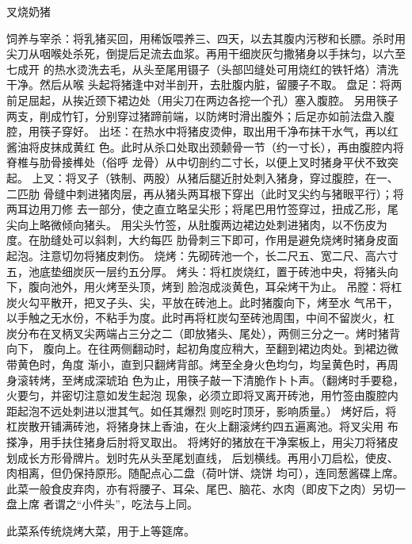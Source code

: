 \begin{recipe}{叉烧奶猪}

\ingredients


\preparation

\step 饲养与宰杀：将乳猪买回，用稀饭喂养三、四天，以去其腹内污秽和长膘。杀时用
尖刀从咽喉处杀死，倒提后足流去血浆。再用干细炭灰匀撒猪身以手抹匀，以六至七成开
的热水烫洗去毛，从头至尾用镊子（头部凹缝处可用烧红的铁钎烙）清洗干净。然后从喉
头起将猪逢中对半剖开，去肚腹内脏，留腰子不取。
\step 盘足：将两前足屈起，从挨近颈下裙边处（用尖刀在两边各挖一个孔）塞入腹腔。
另用筷子两支，削成竹钉，分别穿过猪蹄前端，以防烤时滑出腹外；后足亦如前法盘入腹
腔，用筷子穿好。
\step 出坯：在热水中将猪皮烫伸，取出用千净布抹干水气，再以红酱油将皮抹成黄红
色。此时从杀口处取出颈颡骨一节（约一寸长），再由腹腔内将脊椎与肋骨接榫处（俗呼
龙骨）从中切剖约二寸长，以便上叉时猪身平伏不致突起。
\step 上叉：将叉子（铁制、两股）从猪后腿近肘处刺入猪身，穿过腹腔，在一、二匹肋
骨缝中刺进猪肉层，再从猪头两耳根下穿出（此时叉尖约与猪眼平行）；将两耳边用刀修
去一部分，使之直立略呈尖形；将尾巴用竹签穿过，扭成乙形，尾尖向上略微倾向猪头。
用尖头竹签，从肚腹两边裙边处刺进猪肉，以不伤皮为度。在肋缝处可以斜刺，大约每匹
肋骨刺三下即可，作用是避免烧烤时猪身皮面起泡。注意切勿将猪皮刺伤。
\step 烧烤：先砌砖池一个，长二尺五、宽二尺、高六寸五，池底垫细炭灰一层约五分厚。
\step 烤头：将杠炭烧红，置于砖池中央，将猪头向下，腹向池外，用火烤至头顶，烤到
脸泡成淡黄色，耳朵烤干为止。
\step 吊膛：将杠炭火勾平散开，把叉子头、尖，平放在砖池上。此时猪腹向下，烤至水
气吊干，以手触之无水份，不粘手为度。此时再将杠炭勾至砖池周围，中间不留炭火，杠
炭分布在叉柄叉尖两端占三分之二（即放猪头、尾处），两侧三分之一。烤时猪背向下，
腹向上。在往两侧翻动时，起初角度应稍大，至翻到裙边肉处。到裙边微带黄色时，角度
渐小，直到只翻烤背部。烤至全身火色均匀，均呈黄色时，再周身滚转烤，至烤成深琥珀
色为止，用筷子敲一下清脆作卜卜声。（翻烤时手要稳，火要匀，并密切注意如发生起泡
现象，必须立即将叉离开砖池，用竹签由腹腔内距起泡不远处刺进以泄其气。如任其爆烈
则吃时顶牙，影响质量。）
烤好后，将杠炭散开铺满砖池，将猪身抹上香油，在火上翻滚烤约四五遍离池。将叉尖用
布搽净，用手扶住猪身后肘将叉取出。
将烤好的猪放在干净案板上，用尖刀将猪皮划成长方形骨牌片。划时先从头至尾划直线，
后划横线。再用小刀启松，使皮、肉相离，但仍保持原形。随配点心二盘（荷叶饼、烧饼
均可），连同葱酱碟上席。
此菜一般食皮弃肉，亦有将腰子、耳朵、尾巴、脑花、水肉（即皮下之肉）另切一盘上席
者谓之“小件头”，吃法与上同。

\features

此菜系传统烧烤大菜，用于上等筵席。

\end{recipe}


